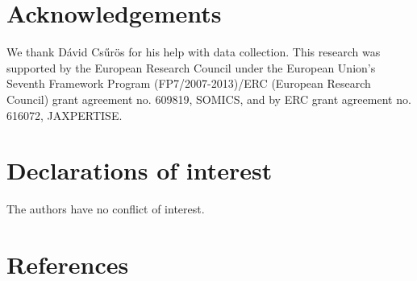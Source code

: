\documentclass[
  english,
  man,floatsintext]{apa6}
\begin{document}
\hypertarget{acknowledgements}{%
\section{Acknowledgements}\label{acknowledgements}}

We thank Dávid Csűrös for his help with data collection. This research was supported by the European Research Council under the European Union's Seventh Framework Program (FP7/2007-2013)/ERC (European Research Council) grant agreement no. 609819, SOMICS, and by ERC grant agreement no. 616072, JAXPERTISE.

\hypertarget{declarations-of-interest}{%
\section{Declarations of interest}\label{declarations-of-interest}}

The authors have no conflict of interest.

\newpage

\hypertarget{references}{%
\section{References}\label{references}}

\begingroup
\setlength{\parindent}{-0in}
\setlength{\leftskip}{0in}
\end{document}
